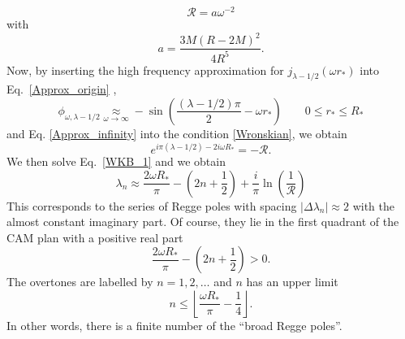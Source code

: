 \documentclass[aps,prd,longbibliography,reprint,twocolumn,amsmath,amssymb,amsfonts,showpacs,superscriptaddress]{revtex4-1}%
\begin{document}
\begin{equation}\label{R_reflection_1}
  \mathcal{R} = a \omega^{-2}
\end{equation}
with
\begin{equation}\label{a_def}
a= \frac{3M \left(R-2M\right)^2}{4 R^5}.
\end{equation}
Now, by inserting the high frequency approximation for $j_{\lambda-1/2} (\omega r_*)$ into Eq.~\eqref{Approx_origin} \cite{nist},
\begin{equation}\label{Approx_origin_bis}
  \phi^{}_{\omega,\lambda-1/2} \underset{\omega \to \infty}{\approx} - \sin\left(\frac{\left(\lambda-1/2\right)\pi}{2}-\omega r_*\right)\quad\quad 0\leq r_*\leq R_*
\end{equation}
and Eq. \eqref{Approx_infinity} into the condition  \eqref{Wronskian}, we obtain
\begin{equation}\label{WKB_1}
   e^{ i\pi (\lambda-1/2)- 2 i \omega R_*}=-\mathcal{R}.
\end{equation}
%
We then solve Eq.~\eqref{WKB_1} and we obtain
\begin{equation}\label{lambda_Approx}
  \lambda_n \approx \frac{2 \omega R_*}{\pi}-\left(2n+\frac{1}{2}\right)+\frac{i}{\pi} \ln\left(\frac{1}{\mathcal{R}}\right)
\end{equation}
This corresponds to the series of Regge poles with spacing $|\Delta \lambda_n|\approx 2$ with the almost constant  imaginary part. Of course, they lie in the first quadrant of the CAM plan with a positive real part
%
\begin{equation}\label{Real_Part}
  \frac{2 \omega R_*}{\pi}-\left(2n+\frac{1}{2}\right)>0.
\end{equation}
%
The overtones are labelled by $n =1,2,\ldots$ and $n$ has an upper limit
%
\begin{equation}\label{Limit_Broad_RP}
n \leq \left\lfloor \frac{\omega R_*}{\pi} - \frac{1}{4}\right\rfloor.
\end{equation}
%
In other words, there is a finite number of the ``broad Regge poles''.



\end{document}
